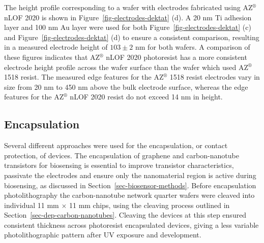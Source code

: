 \documentclass[
  a4paper,
]{scrbook}
\begin{document}
The height profile corresponding to a wafer with electrodes fabricated
using AZ\(^\circledR\) nLOF 2020 is shown in
Figure~\ref{fig-electrodes-dektat} (d). A 20 nm Ti adhesion layer and
100 nm Au layer were used for both Figure~\ref{fig-electrodes-dektat}
(c) and Figure~\ref{fig-electrodes-dektat} (d) to ensure a consistent
comparison, resulting in a measured electrode height of \(103\pm2\) nm
for both wafers. A comparison of these figures indicates that
AZ\(^\circledR\) nLOF 2020 photoresist has a more consistent electrode
height profile across the wafer surface than the wafer which used
AZ\(^\circledR\) 1518 resist. The measured edge features for the
AZ\(^\circledR\) 1518 resist electrodes vary in size from 20 nm to 450
nm above the bulk electrode surface, whereas the edge features for the
AZ\(^\circledR\) nLOF 2020 resist do not exceed 14 nm in height.

\hypertarget{sec-encapsulation}{%
\subsection{Encapsulation}\label{sec-encapsulation}}

Several different approaches were used for the encapsulation, or contact
protection, of devices. The encapsulation of graphene and
carbon-nanotube transistors for biosensing is essential to improve
transistor characteristics, passivate the electrodes and ensure only the
nanomaterial region is active during biosensing, as discussed in
Section~\ref{sec-biosensor-methods}. Before encapsulation
photolithography the carbon-nanotube network quarter wafers were cleaved
into individual 11 mm \(\times\) 11 mm chips, using the cleaving process
outlined in Section~\ref{sec-dep-carbon-nanotubes}. Cleaving the devices
at this step ensured consistent thickness across photoresist
encapsulated devices, giving a less variable photolithographic pattern
after UV exposure and development.
\end{document}
